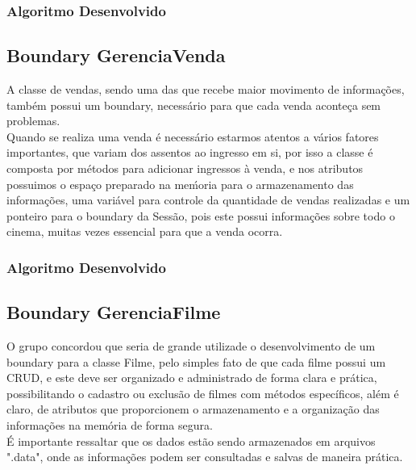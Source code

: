 \documentclass[a4paper]{article}
\begin{document}
\subsubsection{Algoritmo Desenvolvido}


\pagebreak

\subsection{Boundary GerenciaVenda}
\hspace{5 mm}A classe de vendas, sendo uma das que recebe maior movimento de informações, também possui um boundary, necessário para que cada venda aconteça sem problemas.\\
\quad{\null}\hspace{5 mm}Quando se realiza uma venda é necessário estarmos atentos a vários fatores importantes, que variam dos assentos ao ingresso em si, por isso a classe é composta por métodos para adicionar ingressos à venda, e nos atributos possuimos o espaço preparado na meḿoria para o armazenamento das informações, uma variável para controle da quantidade de vendas realizadas e um ponteiro para o boundary da Sessão, pois este possui informações sobre todo o cinema, muitas vezes essencial para que a venda ocorra.
\subsubsection{Algoritmo Desenvolvido}


\pagebreak

\subsection{Boundary GerenciaFilme}
\hspace{5 mm}O grupo concordou que seria de grande utilizade o desenvolvimento de um boundary para a classe Filme, pelo simples fato de que cada filme possui um CRUD, e este deve ser organizado e administrado de forma clara e prática, possibilitando o cadastro ou exclusão de filmes com métodos específicos, além é claro, de atributos que proporcionem o armazenamento e a organização das informações na memória de forma segura.\\
\quad{\null}\hspace{5 mm}É importante ressaltar que os dados estão sendo armazenados em arquivos ".data", onde as informações podem ser consultadas e salvas de maneira prática.
\end{document}
